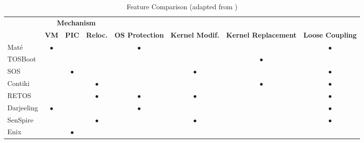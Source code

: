 \begin{table}[htb]
	\scriptsize
	\centering
	\caption{Feature Comparison (adapted from \cite{oliver2014reprogramming})}
	\label{tab:deployMethods}
	\begin{tabular}{lccccccc}
		& \multicolumn{3}{c}{\textbf{Mechanism}}       & \multicolumn{4}{c}{}                                                                                          \\
		& \textbf{VM} & \textbf{PIC} & \textbf{Reloc.} & \textbf{OS Protection} & \textbf{Kernel Modif.} & \textbf{Kernel Replacement} & \textbf{Loose Coupling} \\ \hline
		Mat\'e\cite{levis2002mate}      & $\bullet$           &              &                 & $\bullet$                      &                              &                             & $\bullet$                      \\ \hline
		TOSBoot\cite{hui2004dynamic}    &             &              &                 &                        &                              & $\bullet$                           &                         \\ \hline
		SOS\cite{han2005dynamic}        &             & $\bullet$            &                 &                        & $\bullet$                            &                             & $\bullet$                       \\ \hline
		Contiki\cite{dunkels2004contiki}    &             &              & $\bullet$               &                        &                              & $\bullet$                           & $\bullet$                       \\ \hline
		RETOS\cite{cha2007retos}      &             &              & $\bullet$               & $\bullet$                      & $\bullet$                            &                             & $\bullet$                       \\ \hline
		Darjeeling\cite{brouwers2009darjeeling} & $\bullet$           &              &                 & $\bullet$                      &                              &                             & $\bullet$                       \\ \hline
		SenSpire\cite{dong2009dynamic}   &             &              & $\bullet$               &                        & $\bullet$                            &                             & $\bullet$                       \\ \hline
		Enix\cite{chen2010enix}       &             & $\bullet$            &                 &                        &                              &                             &                         \\ \hline
	\end{tabular}
\end{table}

